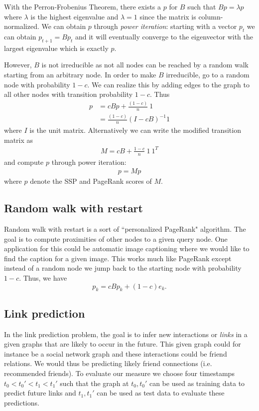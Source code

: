 \bigskip

\noindent With the Perron-Frobenius Theorem, there exists a $p$ for $B$ such that $Bp = \lambda p$ where $\lambda$ is the highest eigenvalue and $\lambda = 1$ since the matrix is column-normalized. We can obtain $p$ through \emph{power iteration}: starting with a vector $p_t$ we can obtain $p_{t+1} = B p_t$ and it will eventually converge to the eigenvector with the largest eigenvalue which is exactly $p$.

However, $B$ is not irreducible as not all nodes can be reached by a random walk starting from an arbitrary node. In order to make $B$ irreducible, go to a random node with probability $1-c$. We can realize this by adding edges to the graph to all other nodes with transition probability $1-c$. Thus
\begin{align*}
    p &= cBp + \frac{(1-c)}{n} \ 1\\
    &= \frac{(1-c)}{n} \left( I - cB \right)^{-1} 1
\end{align*}
where $I$ is the unit matrix. Alternatively we can write the modified transition matrix as
\begin{align*}
    M = cB + \frac{1-c}{n} \ 1 \ 1^T
\end{align*}
and compute $p$ through power iteration:
\begin{align*}
    p = Mp
\end{align*}
where $p$ denote the SSP and PageRank scores of $M$.

\subsection{Random walk with restart}
\bigskip

Random walk with restart is a sort of ``personalized PageRank" algorithm. The goal is to compute proximities of other nodes to a given query node. One application for this could be automatic image captioning where we would like to find the caption for a given image. This works much like PageRank except instead of a random node we jump back to the starting node with probability $1-c$. Thus, we have
$$
p_k = c B p_k + (1-c) e_k.
$$

\subsection{Link prediction}
\bigskip

In the link prediction problem, the goal is to infer new interactions or \emph{links} in a given graphs that are likely to occur in the future. This given graph could for instance be a social network graph and these interactions could be friend relations. We would thus be predicting likely friend connections (i.e. recommended friends). To evaluate our measure we choose four timestamps $t_0 < t_0' < t_1 < t_1'$ such that the graph at $t_0, t_0'$ can be used as training data to predict future links and $t_1, t_1'$ can be used as test data to evaluate these predictions.

